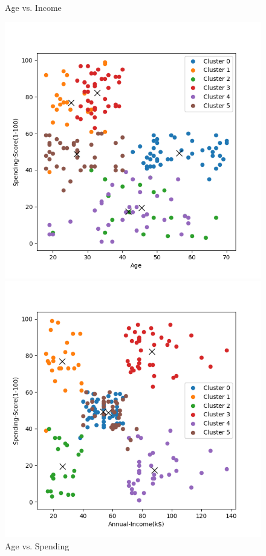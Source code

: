 \documentclass[8pt]{article}
\begin{document}
\begin{figure}[H]
\begin{minipage}{0.32\textwidth}
        \caption{Age vs. Income}
        \label{fig: Age vs. Annual Income k6 com con w}
    \end{minipage}
    \hfill
    \begin{minipage}{0.32\textwidth}
        \centering
        \includegraphics[width=\textwidth]{./Prob4/out/task3_1_com/images/cluster_result_k6_0_2.png}
        \caption{Age vs. Spending}
        \label{fig: Age vs. Spending Score k6 com con w}
    \end{minipage}
    \hfill
    \begin{minipage}{0.32\textwidth}
        \centering
        \includegraphics[width=\textwidth]{./Prob4/out/task3_1_com/images/cluster_result_k6_1_2.png}

\end{minipage}
\end{figure}
\end{document}
